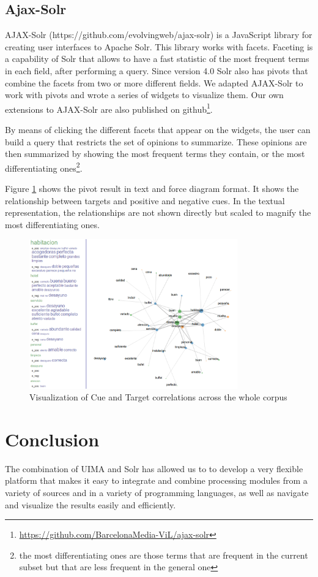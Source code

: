 \documentclass{llncs}
\begin{document}
\subsection{Ajax-Solr}

AJAX-Solr (https://github.com/evolvingweb/ajax-solr) is a JavaScript library for creating user interfaces to Apache Solr. This library works with facets. Faceting is a capability of Solr that allows to have a fast statistic of the most frequent terms in each field, after performing a query. Since version 4.0 Solr also has pivots that combine the facets from two or more different fields. We adapted AJAX-Solr to work with pivots and wrote a series of widgets to visualize them. Our own extensions to AJAX-Solr are also published on github\footnote{\url{https://github.com/BarcelonaMedia-ViL/ajax-solr}}.

By means of clicking the different facets that appear on the widgets, the user can build a query that restricts the set of opinions to summarize. These opinions are then summarized by showing the most frequent terms they contain, or the most differentiating ones\footnote{the most differentiating ones are those terms that are frequent in the current subset but that are less frequent in the general one}. 

Figure \ref{fig:solr} shows the pivot result in text and force diagram format. It shows the relationship between targets and positive and negative cues. In the textual representation, the relationships are not shown directly but scaled to magnify the most differentiating ones. 

\begin{figure}[ht]
\centering
\includegraphics[width=9cm]{solr_visualization.png}
\caption{Visualization of Cue and Target correlations across the whole corpus} 
\label{fig:solr}
\end{figure}

\section{Conclusion}
The combination of UIMA and Solr has allowed us to to develop a very flexible platform that makes it easy to integrate and combine processing modules from a variety of sources and in a variety of programming languages, as well as navigate and visualize the results easily and efficiently.
\end{document}
